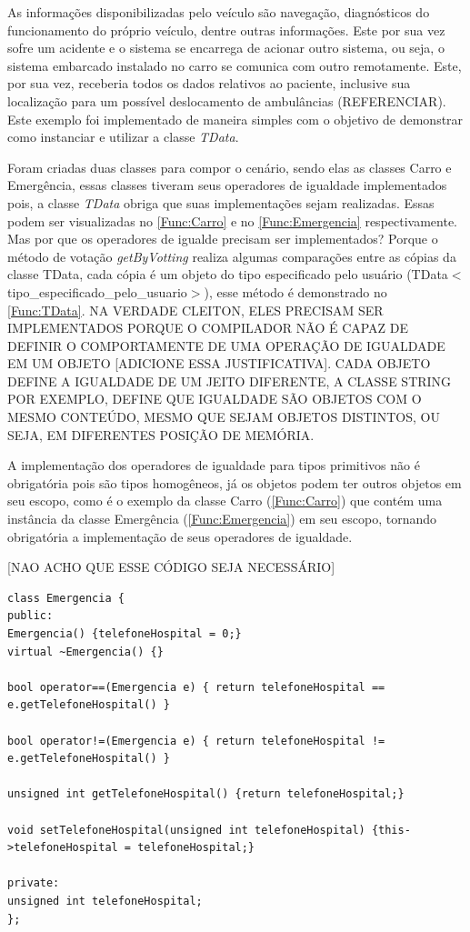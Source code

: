 As informações disponibilizadas pelo veículo são navegação, diagnósticos do funcionamento do próprio veículo, dentre outras informações. Este por sua vez sofre um acidente e o sistema se encarrega de acionar outro sistema, ou seja, o sistema embarcado instalado no carro se comunica com outro remotamente. Este, por sua vez, receberia todos os dados relativos ao paciente, inclusive sua localização para um possível deslocamento de ambulâncias (REFERENCIAR). Este exemplo foi implementado de maneira simples com o objetivo de demonstrar como instanciar e utilizar a classe \textit{TData}. 

Foram criadas duas classes para compor o cenário, sendo elas as classes Carro e Emergência, essas classes tiveram seus operadores de igualdade implementados pois, a classe \textit{TData} obriga que suas implementações sejam realizadas. Essas podem ser visualizadas no \autoref{Func:Carro} e no \autoref{Func:Emergencia} respectivamente. Mas por que os operadores de igualde precisam ser implementados? Porque o método de votação \textit{getByVotting} realiza algumas comparações entre as cópias da classe TData, cada cópia é um objeto do tipo especificado pelo usuário (TData$<$tipo\_especificado\_pelo\_usuario$>$), esse método é demonstrado no \autoref{Func:TData}. NA VERDADE CLEITON, ELES PRECISAM SER IMPLEMENTADOS PORQUE O COMPILADOR NÃO É CAPAZ DE DEFINIR O COMPORTAMENTE DE UMA OPERAÇÃO DE IGUALDADE EM UM OBJETO [ADICIONE ESSA JUSTIFICATIVA]. CADA OBJETO DEFINE A IGUALDADE DE UM JEITO DIFERENTE, A CLASSE STRING POR EXEMPLO, DEFINE QUE IGUALDADE SÃO OBJETOS COM O MESMO CONTEÚDO, MESMO QUE SEJAM OBJETOS DISTINTOS, OU SEJA, EM DIFERENTES POSIÇÃO DE MEMÓRIA.

A implementação dos operadores de igualdade para tipos primitivos não é obrigatória pois são tipos homogêneos, já os objetos podem ter outros objetos em seu escopo, como é o exemplo da classe Carro (\autoref{Func:Carro}) que contém uma instância da classe Emergência (\autoref{Func:Emergencia}) em seu escopo, tornando obrigatória a implementação de seus operadores de igualdade.

[NAO ACHO QUE ESSE CÓDIGO SEJA NECESSÁRIO]

\begin{lstlisting}[label=Func:Emergencia,caption={[Classe Emergencia.] Classe de exemplo que contém as informações dos contatos de emergência.}]
class Emergencia {
public:
Emergencia() {telefoneHospital = 0;}
virtual ~Emergencia() {}

bool operator==(Emergencia e) { return telefoneHospital == e.getTelefoneHospital() }

bool operator!=(Emergencia e) { return telefoneHospital != e.getTelefoneHospital() }

unsigned int getTelefoneHospital() {return telefoneHospital;}

void setTelefoneHospital(unsigned int telefoneHospital) {this->telefoneHospital = telefoneHospital;}

private:
unsigned int telefoneHospital;
};

\end{lstlisting}

